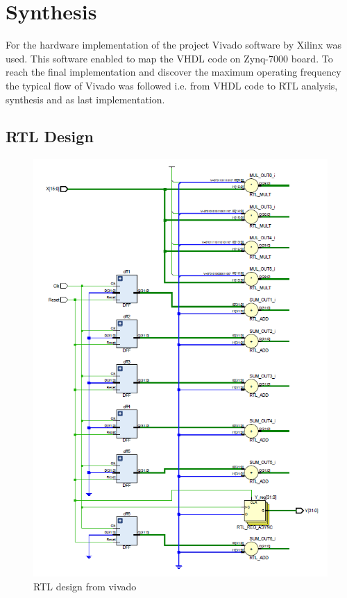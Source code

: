 \section{Synthesis} %
For the hardware implementation of the project Vivado software by Xilinx was used. This software enabled to map the VHDL code on Zynq-7000 board. To reach the final implementation and discover the maximum operating frequency the typical flow of Vivado was followed i.e. from VHDL code to RTL analysis, synthesis and as last implementation.
\label{sec:synthesis_and_implementation}
\subsection{RTL Design}
\begin{figure}[H]
  \centering
  \includegraphics[width=0.9\linewidth]{./images/schematic.PNG}
  \caption{RTL design from vivado}
  \label{fig:schematic}
\end{figure}
